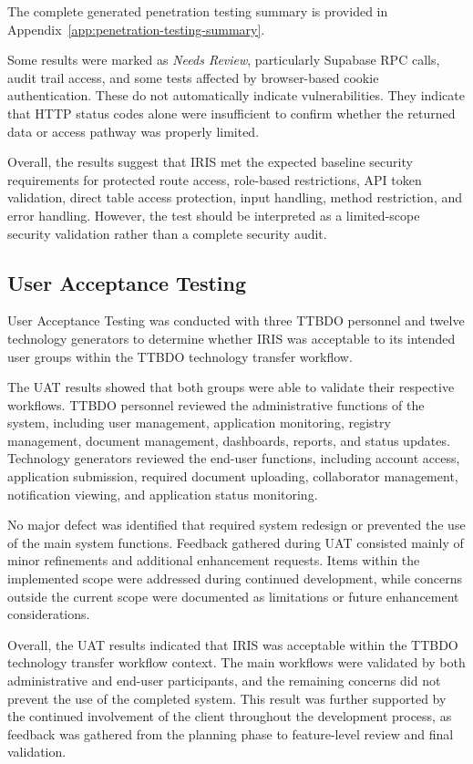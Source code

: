 \FloatBarrier

The complete generated penetration testing summary is provided in Appendix~\ref{app:penetration-testing-summary}.

Some results were marked as \textit{Needs Review}, particularly Supabase RPC calls, audit trail access, and some tests affected by browser-based cookie authentication. These do not automatically indicate vulnerabilities. They indicate that HTTP status codes alone were insufficient to confirm whether the returned data or access pathway was properly limited.

Overall, the results suggest that IRIS met the expected baseline security requirements for protected route access, role-based restrictions, API token validation, direct table access protection, input handling, method restriction, and error handling. However, the test should be interpreted as a limited-scope security validation rather than a complete security audit.

\FloatBarrier

\subsection{User Acceptance Testing}

User Acceptance Testing was conducted with three TTBDO personnel and twelve technology generators to determine whether IRIS was acceptable to its intended user groups within the TTBDO technology transfer workflow.

The UAT results showed that both groups were able to validate their respective workflows. TTBDO personnel reviewed the administrative functions of the system, including user management, application monitoring, registry management, document management, dashboards, reports, and status updates. Technology generators reviewed the end-user functions, including account access, application submission, required document uploading, collaborator management, notification viewing, and application status monitoring.

No major defect was identified that required system redesign or prevented the use of the main system functions. Feedback gathered during UAT consisted mainly of minor refinements and additional enhancement requests. Items within the implemented scope were addressed during continued development, while concerns outside the current scope were documented as limitations or future enhancement considerations.

Overall, the UAT results indicated that IRIS was acceptable within the TTBDO technology transfer workflow context. The main workflows were validated by both administrative and end-user participants, and the remaining concerns did not prevent the use of the completed system. This result was further supported by the continued involvement of the client throughout the development process, as feedback was gathered from the planning phase to feature-level review and final validation.